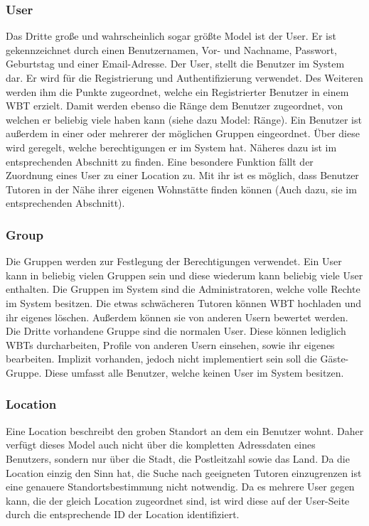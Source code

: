 \subsubsection{User}
Das Dritte große und wahrscheinlich sogar größte Model ist der User. Er ist
gekennzeichnet durch einen Benutzernamen, Vor- und Nachname, Passwort,
Geburtstag und einer Email-Adresse. Der User, stellt die Benutzer im System dar.
Er wird für die Registrierung und Authentifizierung verwendet. Des Weiteren
werden ihm die Punkte zugeordnet, welche ein Registrierter Benutzer in einem WBT
erzielt. Damit werden ebenso die Ränge dem Benutzer zugeordnet, von welchen er
beliebig viele haben kann (siehe dazu Model: Ränge). 
Ein Benutzer ist außerdem in einer oder mehrerer der möglichen Gruppen
eingeordnet.
Über diese wird geregelt, welche berechtigungen er im System hat. Näheres dazu
ist im entsprechenden Abschnitt zu finden.
Eine besondere Funktion fällt der Zuordnung eines User zu einer Location zu. Mit
ihr ist es möglich, dass Benutzer Tutoren in der Nähe ihrer eigenen Wohnstätte
finden können (Auch dazu, sie im entsprechenden Abschnitt).

\subsubsection{Group}
Die Gruppen werden zur Festlegung der Berechtigungen verwendet. Ein User
kann in beliebig vielen Gruppen sein und diese wiederum kann beliebig viele User
enthalten. Die Gruppen im System sind die Administratoren, welche volle Rechte
im System besitzen. Die etwas schwächeren Tutoren können WBT hochladen und ihr
eigenes löschen. Außerdem können sie von anderen Usern bewertet werden. Die
Dritte vorhandene Gruppe sind die normalen User. Diese können lediglich WBTs
durcharbeiten, Profile von anderen Usern einsehen, sowie ihr eigenes bearbeiten.
Implizit vorhanden, jedoch nicht implementiert sein soll die Gäste-Gruppe. Diese
umfasst alle Benutzer, welche keinen User im System besitzen.

\subsubsection{Location}
Eine Location beschreibt den groben Standort an dem ein Benutzer wohnt. Daher
verfügt dieses Model auch nicht über die kompletten Adressdaten eines Benutzers,
sondern nur über die Stadt, die Postleitzahl sowie das Land. Da die Location
einzig den Sinn hat, die Suche nach geeigneten Tutoren einzugrenzen ist eine
genauere Standortsbestimmung nicht notwendig. Da es mehrere User gegen kann, die
der gleich Location zugeordnet sind, ist wird diese auf der User-Seite durch die
entsprechende ID der Location identifiziert. 

